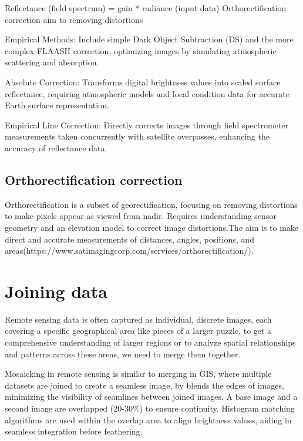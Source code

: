 \documentclass[
  letterpaper,
  DIV=11,
  numbers=noendperiod]{scrreprt}
\begin{document}
Reflectance (field spectrum) = gain * radiance (input data)
Orthorectification correction aim to removing distortions

Empirical Methods: Include simple Dark Object Subtraction (DS) and the
more complex FLAASH correction, optimizing images by simulating
atmospheric scattering and absorption.

Absolute Correction: Transforms digital brightness values into scaled
surface reflectance, requiring atmospheric models and local condition
data for accurate Earth surface representation.

Empirical Line Correction: Directly corrects images through field
spectrometer measurements taken concurrently with satellite overpasses,
enhancing the accuracy of reflectance data.

\subsection{Orthorectification
correction}\label{orthorectification-correction}

Orthorectification is a subset of georectification, focusing on removing
distortions to make pixels appear as viewed from nadir. Requires
understanding sensor geometry and an elevation model to correct image
distortions.The aim is to make direct and accurate measurements of
distances, angles, positions, and
areas(https://www.satimagingcorp.com/services/orthorectification/).

\section{Joining data}\label{joining-data}

Remote sensing data is often captured as individual, discrete images,
each covering a specific geographical area like pieces of a larger
puzzle, to get a comprehensive understanding of larger regions or to
analyze spatial relationships and patterns across these areas, we need
to merge them together.

Mosaicking in remote sensing is similar to merging in GIS, where
multiple datasets are joined to create a seamless image, by blends the
edges of images, minimizing the visibility of seamlines between joined
images. A base image and a second image are overlapped (20-30\%) to
ensure continuity. Histogram matching algorithms are used within the
overlap area to align brightness values, aiding in seamless integration
before feathering.

\end{document}
